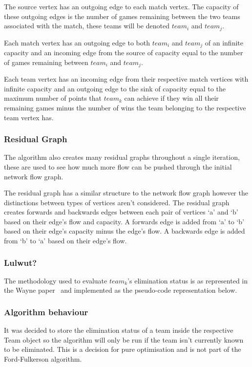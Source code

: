 The source vertex has an outgoing edge to each match vertex.
The capacity of these outgoing edges is the number of games remaining between
the two teams associated with the match, these teams will be denoted
$team_i$ and $team_j$.

Each match vertex has an outgoing edge to both $team_i$ and $team_j$ of an 
infinite capacity and an incoming edge from the source of capacity equal to the 
number of games remaining between $team_i$ and $team_j$.

Each team vertex has an incoming edge from their respective match vertices with
infinite capacity and an outgoing edge to the sink of capacity equal to the 
maximum number of points that $team_k$ can achieve if they win all their 
remaining games minus the number of wins the team belonging to the respective 
team vertex has. 

\subsubsection{Residual Graph}

The algorithm also creates many residual graphs throughout a single iteration,
these are used to see how much more flow can be pushed through the initial
network flow graph.

The residual graph has a similar structure to the network flow graph however
the distinctions between types of vertices aren't considered. The residual
graph creates forwards and backwards edges between each pair of vertices `a'
and `b' based on their edge's flow and capacity. A forwards edge is added from
`a' to `b' based on their edge's capacity minus the edge's flow. A backwards 
edge is added from `b' to `a' based on their edge's flow.

\subsubsection{Lulwut?}

The methodology used to evaluate $team_k$'s elimination status is as
represented in the Wayne paper~\cite{Wayne} and implemented as the
pseudo-code representation below. 

\subsubsection{Algorithm behaviour}

It was decided to store the elimination status of a team inside the
respective Team object so the algorithm will only be run if the team isn't
currently known to be eliminated. This is a decision for pure optimisation and 
is not part of the Ford-Fulkerson algorithm.

